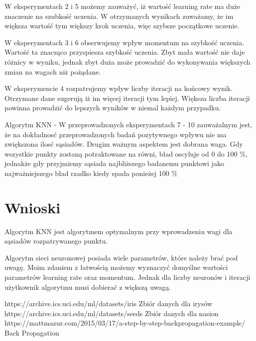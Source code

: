 \documentclass{classrep}
\begin{document}
W eksperymentach 2 i 5 możemy zauważyć, iż wartość learning rate ma duże znaczenie na szubkość uczenia. W otrzymanych wynikach zuważamy, że im większa wartość tym większy krok uczenia, więc szybsze początkowe uczenie.


W eksperymentach 3 i 6 obserwujemy wpływ momentum na szybkość uczenia. Wartość ta znacząco przyspiesza szybkość uczenia. Zbyt mała wartość nie daje różnicy w wyniku, jednak zbyt duża może prowadzić do wykonywania większych zmian na wagach niż pożądane.


W eksperymencie 4 rozpatrujemy wpływ liczby iteracji na końcowy wynik. Otrzymane dane sugerują iż im więcej iteracji tym lepiej. Większa liczba iteracji powinna prowadzić do lepszych wyników w niemal każdym przypadku.


Algorytm KNN - W przeprowadzonych eksperymentach 7 - 10 zauważalnym jest, że na dokładnosć przeprowadzonych badań pozytywnego wpływu nie ma zwiększona ilosć sąsiadów. Drugim ważnym aspektem jest dobrana waga. Gdy wszystkie punkty zostaną potraktowane na równi, bład oscyluje od 0 do 100 \%, jednakże gdy przyjmiemy sąsiada najbliższego badanemu punktowi jako najważniejszego bład rzadko kiedy spada ponieżej 100 \%
\section{Wnioski}
Algorytm KNN jest algorytmem optymalnym przy wprowadzeniu wagi dla sąsiadów rozpatrywanego punktu.


Algorytm sieci neuronowej posiada wiele parametrów, które należy brać pod uwagę. Moim zdaniem z łatwością możemy wyznaczyć domyślne wartości parametrów learning rate oraz momentum. Jednak dla liczby neuronów i iteracji użytkownik algorytmu musi dobierać z większą uwagą.

\begin{thebibliography}{0}
https://archive.ics.uci.edu/ml/datasets/iris
Zbiór danych dla irysów
https://archive.ics.uci.edu/ml/datasets/seeds
Zbiór danych dla nasion
https://mattmazur.com/2015/03/17/a-step-by-step-backpropagation-example/
Back Propagation
\end{thebibliography}
\end{document}
